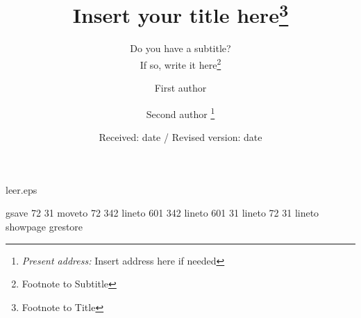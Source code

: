 %
%
%
%
\begin{filecontents}{leer.eps}

gsave
72 31 moveto
72 342 lineto
601 342 lineto
601 31 lineto
72 31 lineto
showpage
grestore
\end{filecontents}
%
\documentclass[def,draft]{svjour}
%
\usepackage{graphics}
%

%
\title{Insert your title here\thanks{Footnote to Title}}
\subtitle{Do you have a subtitle?\\ If so, write it
here\thanks{Footnote to Subtitle}}
\author{First author \and Second author%
\fnmsep\thanks{\emph{Present address:} Insert address here if needed}%
}                     %
%
\offprints{}          %
%
%
\date{Received: date / Revised version: date}
%
\maketitle
%
\begin{abstract}
Insert your abstract here.
\end{abstract}

\section{Introduction}\label{intro}

Your text comes here. Separate text sections with

\section{Section title}\label{sec:1}

